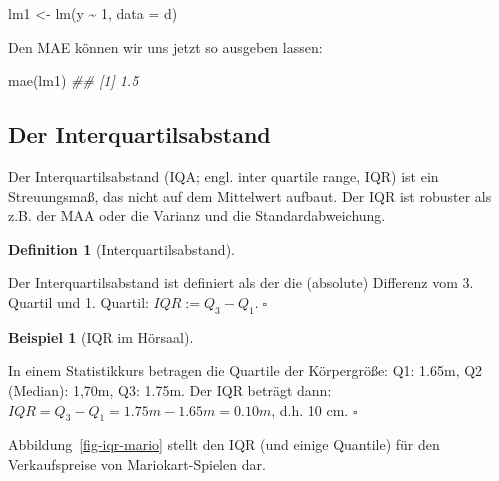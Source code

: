 \documentclass[
  letterpaper,
]{scrbook}
\newenvironment{Shaded}{\begin{snugshade}}{\end{snugshade}}
\newcommand{\AttributeTok}[1]{\textcolor[rgb]{0.40,0.45,0.13}{#1}}
\newcommand{\DecValTok}[1]{\textcolor[rgb]{0.68,0.00,0.00}{#1}}
\newcommand{\DocumentationTok}[1]{\textcolor[rgb]{0.37,0.37,0.37}{\textit{#1}}}
\newcommand{\FunctionTok}[1]{\textcolor[rgb]{0.28,0.35,0.67}{#1}}
\newcommand{\NormalTok}[1]{\textcolor[rgb]{0.00,0.23,0.31}{#1}}
\newcommand{\OtherTok}[1]{\textcolor[rgb]{0.00,0.23,0.31}{#1}}
\newcommand{\SpecialCharTok}[1]{\textcolor[rgb]{0.37,0.37,0.37}{#1}}
\theoremstyle{definition}
\theoremstyle{definition}
\newtheorem{example}{Beispiel}[chapter]
\theoremstyle{definition}
\newtheorem{definition}{Definition}[chapter]
\theoremstyle{remark}
\begin{document}
\begin{Shaded}
\begin{Highlighting}[]
\NormalTok{lm1 }\OtherTok{\textless{}{-}} \FunctionTok{lm}\NormalTok{(y }\SpecialCharTok{\textasciitilde{}} \DecValTok{1}\NormalTok{, }\AttributeTok{data =}\NormalTok{ d)}
\end{Highlighting}
\end{Shaded}

Den MAE können wir uns jetzt so ausgeben lassen:

\begin{Shaded}
\begin{Highlighting}[]
\FunctionTok{mae}\NormalTok{(lm1)}
\DocumentationTok{\#\# [1] 1.5}
\end{Highlighting}
\end{Shaded}

\subsection{Der Interquartilsabstand}\label{der-interquartilsabstand}

Der Interquartilsabstand (IQA; engl. inter quartile range, IQR) ist ein
Streuungsmaß, das nicht auf dem Mittelwert aufbaut. Der IQR ist robuster
als z.B. der MAA oder die Varianz und die Standardabweichung.

\begin{definition}[Interquartilsabstand]\protect\hypertarget{def-iqr}{}\label{def-iqr}

Der Interquartilsabstand ist definiert als der die (absolute) Differenz
vom 3. Quartil und 1. Quartil: \(IQR := Q_3-Q_1. \; \square\)

\end{definition}

\begin{example}[IQR im
Hörsaal]\protect\hypertarget{exm-iqr}{}\label{exm-iqr}

In einem Statistikkurs betragen die Quartile der Körpergröße: Q1: 1.65m,
Q2 (Median): 1,70m, Q3: 1.75m. Der IQR beträgt dann:
\(IQR = Q_3-Q_1 = 1.75m - 1.65m = 0.10m\), d.h. 10 cm. \(\square\)

\end{example}

Abbildung~\ref{fig-iqr-mario} stellt den IQR (und einige Quantile) für
den Verkaufspreise von Mariokart-Spielen dar.
\end{document}
